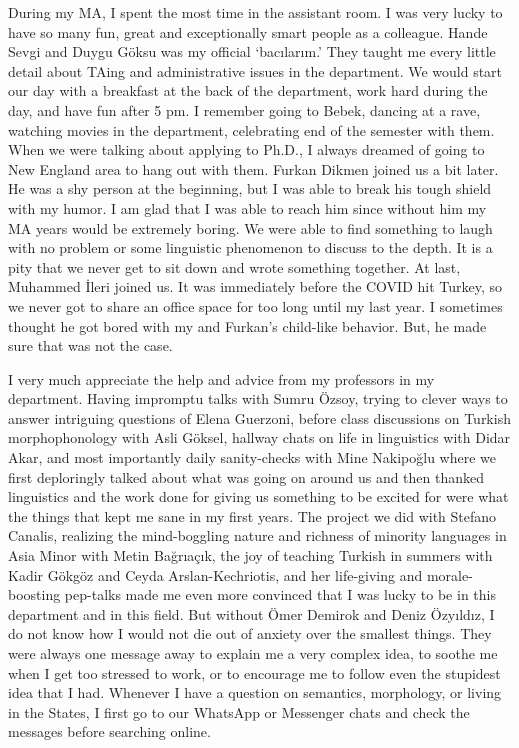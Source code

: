 During my MA, I spent the most time in the assistant room. I was very lucky to have so many fun, great and exceptionally smart people as a colleague. Hande Sevgi and Duygu G\"oksu was my official `bac{\i}lar{\i}m.' They taught me every little detail about TAing and administrative issues in the department. We would start our day with a breakfast at the back of the department, work hard during the day, and have fun after 5 pm. I remember going to Bebek, dancing at a rave, watching movies in the department, celebrating end of the semester with them. When we were talking about applying to Ph.D., I always dreamed of going to New England area to hang out with them. Furkan Dikmen joined us a bit later. He was a shy person at the beginning, but I was able to break his tough shield with my humor. I am glad that I was able to reach him since without him my MA years would be extremely boring. We were able to find something to laugh with no problem or some linguistic phenomenon to discuss to the depth. It is a pity that we never get to sit down and wrote something together. At last, Muhammed {\.I}leri joined us. It was immediately before the COVID hit Turkey, so we never got to share an office space for too long until my last year. I sometimes thought he got bored with my and Furkan's child-like behavior. But, he made sure that was not the case.

I very much appreciate the help and advice from my professors in my department. Having impromptu talks with Sumru \"Ozsoy, trying to clever ways to answer intriguing questions of Elena Guerzoni, before class discussions on Turkish morphophonology with Asli G\"oksel, hallway chats on life in linguistics with Didar Akar, and most importantly daily sanity-checks with Mine Nakipo\u{g}lu where we first deploringly talked about what was going on around us and then thanked linguistics and the work done for giving us something to be excited for were what the things that kept me sane in my first years. The project we did with Stefano Canalis, realizing the mind-boggling nature and richness of minority languages in Asia Minor with Metin Ba\u{g}r{\i}a\c{c}{\i}k, the joy of teaching Turkish in summers with Kadir G\"okg\"oz and Ceyda Arslan-Kechriotis, and her life-giving and morale-boosting pep-talks made me even more convinced that I was lucky to be in this department and in this field. But without \"Omer Demirok and Deniz \"Ozy{\i}ld{\i}z, I do not know how I would not die out of anxiety over the smallest things. They were always one message away to explain me a very complex idea, to soothe me when I get too stressed to work, or to encourage me to follow even the stupidest idea that I had. Whenever I have a question on semantics, morphology, or living in the States, I first go to our WhatsApp or Messenger chats and check the messages before searching online. 

